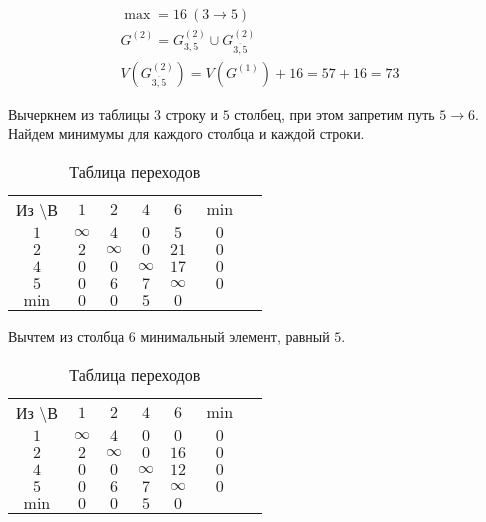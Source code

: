 \begin{gather*}
\max = 16\ (3 \rightarrow 5) \\
G^{(2)} = G_{3,5}^{(2)} \cup G_{\overline{3,5}}^{(2)} \\
V(G_{\overline{3,5}}^{(2)}) = V(G^{(1)}) + 16 = 57 + 16 = 73
\end{gather*}

Вычеркнем из таблицы $3$ строку и $5$ столбец, при этом запретим путь $5 \rightarrow 6$. Найдем минимумы для каждого столбца и каждой строки.

\begin{table}[H]
\begin{center}
	\def\tabcolsep{15pt}
	\caption{Таблица переходов}
	\label{tab:12}
	\begin{tabular}{|c||c|c|c|c|c|c|}
		\hline
		Из \textbackslash В & $1$ & $2$ & $4$ & $6$ & $\min$ \\
		\hhline{|=#=|=|=|=|=|}
		$1$ & $\infty$ & $4$ & $0$ & $5$ & $0$ \\
		\hline
		$2$ & $2$ & $\infty$ & $0$ & $21$ & $0$ \\
		\hline
		$4$ & $0$ & $0$ & $\infty$ & $17$ & $0$ \\
		\hline
		$5$ & $0$ & $6$ & $7$ & $\infty$ & $0$ \\
		\hhline{|=#=|=|=|=|=|} 
		$\min$ & $0$ & $0$ & $5$ & $0$ & \\ 
		\hline
	\end{tabular}
\end{center}
\end{table}

Вычтем из столбца $6$ минимальный элемент, равный $5$.

\begin{table}[H]
\begin{center}
	\def\tabcolsep{15pt}
	\caption{Таблица переходов}
	\label{tab:13}
	\begin{tabular}{|c||c|c|c|c|c|c|}
		\hline
		Из \textbackslash В & $1$ & $2$ & $4$ & $6$ & $\min$ \\
		\hhline{|=#=|=|=|=|=|}
		$1$ & $\infty$ & $4$ & $0$ & $0$ & $0$ \\
		\hline
		$2$ & $2$ & $\infty$ & $0$ & $16$ & $0$ \\
		\hline
		$4$ & $0$ & $0$ & $\infty$ & $12$ & $0$ \\
		\hline
		$5$ & $0$ & $6$ & $7$ & $\infty$ & $0$ \\
		\hhline{|=#=|=|=|=|=|} 
		$\min$ & $0$ & $0$ & $5$ & $0$ & \\ 
		\hline
	\end{tabular}
\end{center}
\end{table}

